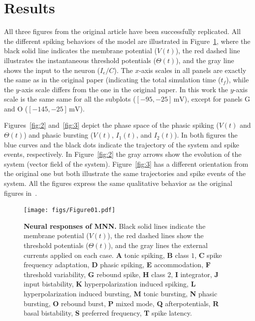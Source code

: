 \documentclass[10pt,a4paper,onecolumn]{article}
\newcommand{\Rm}[1]{\mathrm{#1}}
\begin{document}
\clearpage

\section{Results}\label{results}

All three figures from the original article have been successfully replicated.
All the different spiking behaviors of the model are illustrated in 
Figure~\ref{fig:1}, where the black solid line indicates the membrane potential
($V(t)$), the red dashed line illustrates the instantaneous threshold potentials
($\Theta(t)$), and the gray line shows the input to the neuron ($I_e/C$). 
The $x$-axis scales in all panels are exactly the same as in the original
paper (indicating the total simulation time ($t_f$), while the $y$-axis scale 
differs from the one in the original paper. In this work the $y$-axis scale
is the same same for all the subplots ($[-95, -25]\, \Rm{mV}$), except for
panels G and O ($[-145, -25]\, \Rm{mV}$).

Figures~\ref{fig:2} and~\ref{fig:3} depict the phase space of the phasic
spiking ($V(t)$ and $\Theta(t)$) and phasic bursting ($V(t)$,
$I_1(t)$, and $I_2(t)$). In both figures the blue curves and the black dots 
indicate the trajectory of the system and spike events, respectively.
In Figure~\ref{fig:2} the gray arrows show the evolution of the system
(vector field of the system). Figure~\ref{fig:3} has a different orientation 
from the original one but both illustrate the same trajectories and spike 
events of the system. 
All the figures express the same qualitative behavior as the original
figures in~\cite{mihalas:2009}.

\begin{figure}[htpb!]
    \centering
    \texttt{[image: figs/Figure01.pdf]}
    \caption{{\bfseries \sffamily Neural responses of MNN.} Black solid lines
    indicate the membrane potential ($V(t)$), the red dashed lines show the
    threshold potentials ($\Theta(t)$), and the gray lines the external
    currents applied on each case.
    {\bfseries \sffamily A} tonic spiking,
    {\bfseries \sffamily B} class $1$,
    {\bfseries \sffamily C} spike frequency adaptation,
    {\bfseries \sffamily D} phasic spiking,
    {\bfseries \sffamily E} accommodation,
    {\bfseries \sffamily F} threshold variability,
    {\bfseries \sffamily G} rebound spike,
    {\bfseries \sffamily H} class $2$,
    {\bfseries \sffamily I} integrator,
    {\bfseries \sffamily J} input bistability,
    {\bfseries \sffamily K} hyperpolarization induced spiking,
    {\bfseries \sffamily L} hyperpolarization induced bursting,
    {\bfseries \sffamily M} tonic bursting,
    {\bfseries \sffamily N} phasic bursting,
    {\bfseries \sffamily O} rebound burst,
    {\bfseries \sffamily P} mixed mode,
    {\bfseries \sffamily Q} afterpotentials,
    {\bfseries \sffamily R} basal bistability,
    {\bfseries \sffamily S} preferred frequency,
    {\bfseries \sffamily T} spike latency.} 
    \label{fig:1}
\end{figure}
\end{document}

